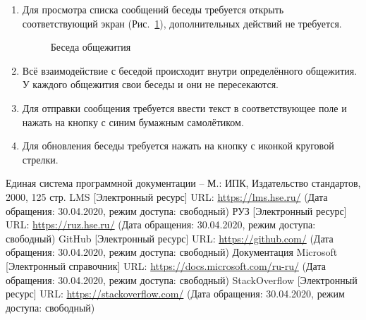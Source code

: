 \documentclass{../includes/TechDoc}
\begin{document}
    \begin{enumerate}
        \item Для просмотра списка сообщений беседы требуется открыть соответствующий экран (Рис.~\ref{fig:chat}), дополнительных действий не требуется.
        \begin{figure}[ht]
            \centering
            \caption{Беседа общежития}
            \label{fig:chat}
        \end{figure}

        \item Всё взаимодействие с беседой происходит внутри определённого общежития. У каждого общежития свои беседы и они не пересекаются.
        \item Для отправки сообщения требуется ввести текст в соответствующее поле и нажать на кнопку с синим бумажным самолётиком.
        \item Для обновления беседы требуется нажать на кнопку с иконкой круговой стрелки.
    \end{enumerate}


    \begin{thebibliography}{3}
        Единая система программной документации – М.: ИПК, Издательство стандартов, 2000, 125 стр.
         LMS [Электронный ресурс] URL: \url{https://lms.hse.ru/} (Дата обращения: 30.04.2020, режим доступа: свободный)
         РУЗ [Электронный ресурс] URL: \url{https://ruz.hse.ru/} (Дата обращения: 30.04.2020, режим доступа: свободный)
         GitHub [Электронный ресурс] URL: \url{https://github.com/} (Дата обращения: 30.04.2020, режим доступа: свободный)
         Документация Microsoft [Электронный справочник] URL: \url{https://docs.microsoft.com/ru-ru/} (Дата обращения: 30.04.2020, режим доступа: свободный)
         StackOverflow [Электронный ресурс] URL: \url{https://stackoverflow.com/} (Дата обращения: 30.04.2020, режим доступа: свободный)
    \end{thebibliography}


    \registrationList
\end{document}
